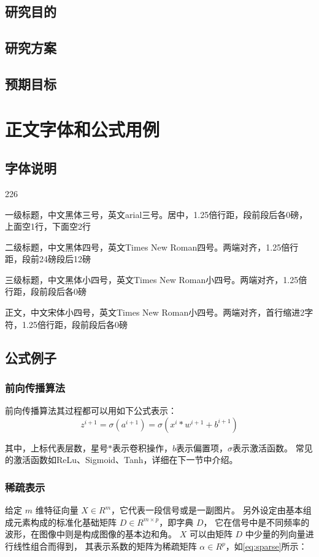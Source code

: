 \documentclass[12pt]{zjutthesis}
\begin{document}
\section{研究目的}
\section{研究方案}
\section{预期目标}

\chapter{正文字体和公式用例}
\section{字体说明}
\begin{dinglist}{226}
  \item 一级标题，中文黑体三号，英文arial三号。居中，1.25倍行距，段前段后各0磅，上面空1行，下面空2行
  \item 二级标题，中文黑体四号，英文Times New Roman四号。两端对齐，1.25倍行距，段前24磅段后12磅
  \item 三级标题，中文黑体小四号，英文Times New Roman小四号。两端对齐，1.25倍行距，段前段后各0磅
  \item 正文，中文宋体小四号，英文Times New Roman小四号。两端对齐，首行缩进2字符，1.25倍行距，段前段后各0磅
\end{dinglist}

\section{公式例子}
\subsection{前向传播算法}
前向传播算法其过程都可以用如下公式表示：
\begin{equation}
  z^{i+1}=\sigma(a^{i+1})=\sigma(x^i\ast w^{i+1}+b^{i+1})
\end{equation}

其中，上标代表层数，星号$\ast$表示卷积操作，$b$表示偏置项，$\sigma$表示激活函数。
常见的激活函数如ReLu、Sigmoid、Tanh，详细在下一节中介绍。

\subsection{稀疏表示}
给定 $m$ 维特征向量 $X\in R^m$，它代表一段信号或是一副图片。
另外设定由基本组成元素构成的标准化基础矩阵 $D\in R^{m\times p}$，即字典 $D$，
它在信号中是不同频率的波形，在图像中则是构成图像的基本边和角。
$X$ 可以由矩阵 $D$ 中少量的列向量进行线性组合而得到，
其表示系数的矩阵为稀疏矩阵 $\alpha\in R^p$，如\autoref{eq:sparse}所示：
\end{document}
